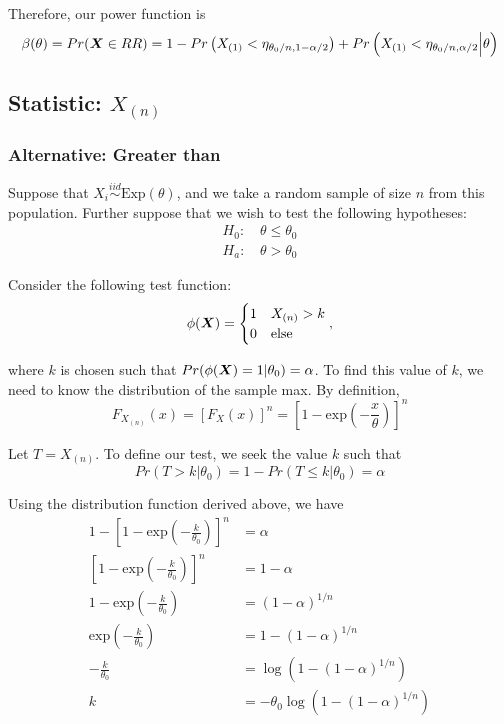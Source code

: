 \documentclass[]{article}
\newcommand{\bfX}{\mbox{\boldmath $X$}}
\begin{document}
Therefore, our power function is
\[
\beta(\theta) = Pr(\bfX \in RR) = 1 - Pr\left(X_{(1)} < \eta_{\theta_0/n, 1 - \alpha/2}\right) + Pr\left(X_{(1)} < \eta_{\theta_0/n, \alpha/2} \Big| \theta\right)
\]

\subsection{Statistic: $X_{(n)}$}

\subsubsection{Alternative: Greater than}

Suppose that $X_i \stackrel{iid}{\sim} \text{Exp}(\theta)$, and we take a random sample of size $n$ from this population. Further suppose that we wish to test the following hypotheses:
\[
\begin{split}
\text{$H_0$: }& \theta \leq \theta_0 \\
\text{$H_a$: }& \theta > \theta_0
\end{split}
\]

Consider the following test function:
\[
\phi(\bfX) = \begin{cases}
1 & X_{(n)} > k \\
0 & \text{else}
\end{cases},
\]

where $k$ is chosen such that $Pr(\phi(\bfX) = 1|\theta_0) = \alpha$. To find this value of $k$, we need to know the distribution of the sample max. By definition, 
\[
F_{X_{(n)}}(x) = \left[F_X(x)\right]^n = \left[1 - \text{exp}(-\frac{x}{\theta})\right]^n
\]


Let $T = X_{(n)}$. To define our test, we seek the value $k$ such that 
\[
Pr(T > k | \theta_0) = 1 - Pr(T \leq k | \theta_0) = \alpha
\]

Using the distribution function derived above, we have
\[
\begin{split}
1 - \left[1 - \text{exp}(-\frac{k}{\theta_0})\right]^n &= \alpha \\
\left[1 - \text{exp}(-\frac{k}{\theta_0})\right]^n &= 1 - \alpha \\
1 - \text{exp}(-\frac{k}{\theta_0}) &= (1-\alpha)^{1/n} \\
\text{exp}(-\frac{k}{\theta_0}) &= 1 - (1-\alpha)^{1/n} \\
-\frac{k}{\theta_0} &= \log(1 - (1-\alpha)^{1/n}) \\
k &= -\theta_0\log(1 - (1-\alpha)^{1/n})
\end{split}
\]
\end{document}
